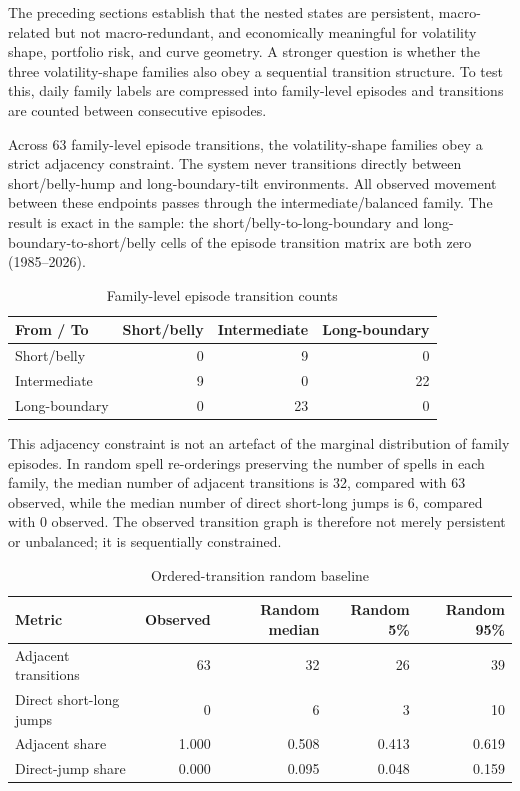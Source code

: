 \documentclass[11pt]{article}
\begin{document}
The preceding sections establish that the nested states are persistent, macro-related but not macro-redundant, and economically meaningful for volatility shape, portfolio risk, and curve geometry. A stronger question is whether the three volatility-shape families also obey a sequential transition structure. To test this, daily family labels are compressed into family-level episodes and transitions are counted between consecutive episodes.

Across 63 family-level episode transitions, the volatility-shape families obey a strict adjacency constraint. The system never transitions directly between short/belly-hump and long-boundary-tilt environments. All observed movement between these endpoints passes through the intermediate/balanced family. The result is exact in the sample: the short/belly-to-long-boundary and long-boundary-to-short/belly cells of the episode transition matrix are both zero (1985--2026).

\begin{table}[H]

\begin{tabular}{lrrr}
\toprule
From / To & Short/belly & Intermediate & Long-boundary \\
\midrule
Short/belly & 0 & 9 & 0 \\
Intermediate & 9 & 0 & 22 \\
Long-boundary & 0 & 23 & 0 \\
\bottomrule
\end{tabular}
\caption{Family-level episode transition counts}
\label{tab:family_transition_counts}
\end{table}

This adjacency constraint is not an artefact of the marginal distribution of family episodes. In random spell re-orderings preserving the number of spells in each family, the median number of adjacent transitions is 32, compared with 63 observed, while the median number of direct short-long jumps is 6, compared with 0 observed. The observed transition graph is therefore not merely persistent or unbalanced; it is sequentially constrained.

\begin{table}[H]
\begin{tabular}{lrrrr}
\toprule
Metric & Observed & Random median & Random 5\% & Random 95\% \\
\midrule
Adjacent transitions & 63 & 32 & 26 & 39 \\
Direct short-long jumps & 0 & 6 & 3 & 10 \\
Adjacent share & 1.000 & 0.508 & 0.413 & 0.619 \\
Direct-jump share & 0.000 & 0.095 & 0.048 & 0.159 \\
\bottomrule
\end{tabular}
\caption{Ordered-transition random baseline}
\label{tab:family_transition_random_baseline}
\end{table}
\end{document}
